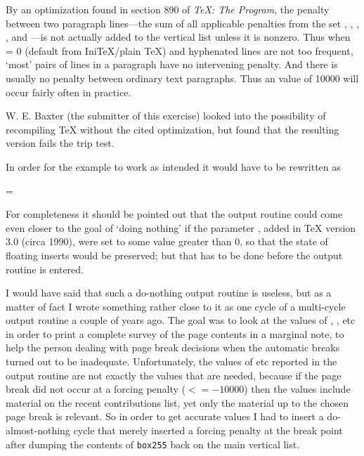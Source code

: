 By an optimization found in section 890 of \emph{TeX: The Program}, the
penalty between two paragraph lines---the sum of all applicable
penalties from the set \cmd{\interlinepenalty}, \cmd{\clubpenalty}, 
\cmd{\widowpenalty}, \cmd{\displaywidowpenalty}, and \cmd{\brokenpenalty}---is 
not actually added to
the vertical list unless it is nonzero. Thus when \cmd{\interlinepenalty} =
0 (default from IniTeX/plain TeX) and hyphenated lines are not too
frequent, `most' pairs of lines in a paragraph have no intervening
penalty. And there is usually no penalty between ordinary text
paragraphs. Thus an \cmd{\outputpenalty} value of 10000 will occur fairly
often in practice.

W. E. Baxter
(the submitter of this exercise) 
looked into the
possibility of recompiling TeX without the cited optimization, but found
that the resulting version fails the trip test.

In order for the example to work as intended it would have to be
rewritten as
\begin{lcode}
  \output={
    \ifnum{} \else \penalty\outputpenalty\fi}
\end{lcode}
For completeness it should be pointed out that the output routine
could come even closer to the goal of `doing nothing' if the parameter
\cmd{\holdinginserts}, added in TeX version 3.0 (circa 1990), were set to
some value greater than 0, so that the state of floating inserts would
be preserved; but that has to be done before the output routine is
entered.

I would have said that such a do-nothing output routine is useless, but
as a matter of fact I wrote something rather close to it as one cycle of
a multi-cycle output routine a couple of years ago. The goal was to look
at the values of \cmd{\pagetotal}, \cmd{\pagestretch}, etc in order to print a
complete survey of the page contents in a marginal note, to help the
person dealing with page break decisions when the automatic breaks
turned out to be inadequate. Unfortunately, the values of \cmd{\pagetotal} etc
reported in the output routine are not exactly the values that are
needed, because if the page break did not occur at a forcing penalty 
($<=-10000$) then the values include material on the recent contributions
list, yet only the material up to the chosen page break is relevant. So
in order to get accurate values I had to insert a do-almost-nothing
cycle that merely inserted a forcing penalty at the break point after
dumping the contents of \texttt{box255} back on the main vertical list.

